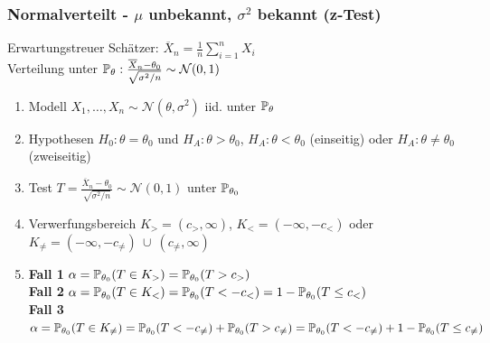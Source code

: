 \subsubsection*{\texorpdfstring{Normalverteilt - \(\mu\) unbekannt, \(\sigma^2\) bekannt (z-Test)}{Normalverteilt - μ unbekannt, σ² bekannt (z-Test)}}
Erwartungstreuer Schätzer: \(\overline{X}_n = \frac{1}{n} \sum_{i=1}^n X_i\)\\
Verteilung unter \(\P_\theta: \frac{\overline{X}_n - \theta_0}{\sqrt{\sigma^2/n}} \sim \mathcal{N}(0,1)\)
\begin{enumerate}
	\item Modell \(X_1, \ldots, X_n \sim \mathcal{N}(\theta, \sigma^2)\) iid. unter \(\P_\theta\)
	\item Hypothesen \(H_0 : \theta = \theta_0\) und \(H_A : \theta > \theta_0\), \(H_A : \theta < \theta_0\) (einseitig) oder \(H_A : \theta \ne \theta_0\) (zweiseitig)
	\item Test \(T = \frac{\overline{X}_n - \theta_0}{\sqrt{\sigma^2/n}} \sim \mathcal{N}(0,1)\) unter \(\P_{\theta_0}\)
	\item Verwerfungsbereich \(K_{>} = (c_{>}, \infty)\), \(K_{<} = (-\infty, -c_{<})\) oder \(K_{\neq} = (-\infty, -c_{\neq}) \ \cup \ (c_{\neq}, \infty)\)
	\item \textbf{Fall 1} \(\alpha = \P_{\theta_0}(T \in K_>) = \P_{\theta_0}(T > c_>)\)\\
	\textbf{Fall 2} \(\alpha = \P_{\theta_0}(T \in K_<) = \P_{\theta_0}(T < -c_<) = 1 - \P_{\theta_0}(T \leq c_<)\)\\
	\textbf{Fall 3} \(\alpha = \P_{\theta_0}(T \in K_{\neq}) = \P_{\theta_0}(T < -c_{\neq}) + \P_{\theta_0}(T > c_{\neq}) = \P_{\theta_0}(T < -c_{\neq}) + 1 - \P_{\theta_0}(T \leq c_{\neq})\)
\end{enumerate}

